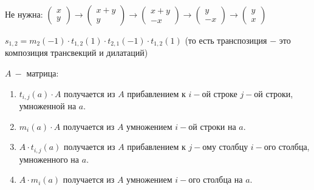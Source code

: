 \begin{statement}
\begin{enumerate}
    Не нужна: $\begin{pmatrix}
        x \\ y
    \end{pmatrix}\rightarrow \begin{pmatrix}
        x + y \\ y
    \end{pmatrix}\rightarrow \begin{pmatrix}
        x + y \\ -x
    \end{pmatrix}\rightarrow \begin{pmatrix}
        y \\ -x
    \end{pmatrix}\rightarrow \begin{pmatrix}
        y \\ x
    \end{pmatrix} $

    $s_{1,2}=m_2(-1)\cdot t_{1,2}(1)\cdot t_{2,1}(-1)\cdot t_{1,2}(1)$ (то 
есть транспозиция $-$ это композиция трансвекций и дилатаций)
    \end{enumerate}
\end{statement}

\begin{statement}
    $A\ -$ матрица:
    \begin{enumerate}
        \item $t_{i,j}(a)\cdot A$ получается из $A$ прибавлением к $i-$ой 
строке $j-$ой строки, умноженной на $a$.
        \item $m_{i}(a)\cdot A$ получается из $A$ умножением $i-$ой строки 
на $a$.
        \item $A\cdot t_{i,j}(a)$ получается из $A$ прибавлением к $j-$ому 
столбцу $i-$ого столбца, умноженного на $a$.
        \item $A\cdot m_{i}(a)$ получается из $A$ умножением $i-$ого 
столбца на $a$.
    \end{enumerate}
\end{statement}

